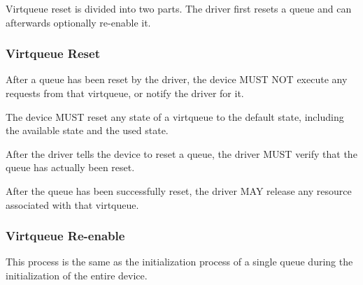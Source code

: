 Virtqueue reset is divided into two parts. The driver first resets a queue and
can afterwards optionally re-enable it.

\subsubsection{Virtqueue Reset}\label{sec:Basic Facilities of a Virtio Device / Virtqueues / Virtqueue Reset / Virtqueue Reset}


After a queue has been reset by the driver, the device MUST NOT execute
any requests from that virtqueue, or notify the driver for it.

The device MUST reset any state of a virtqueue to the default state,
including the available state and the used state.


After the driver tells the device to reset a queue, the driver MUST verify that
the queue has actually been reset.

After the queue has been successfully reset, the driver MAY release any
resource associated with that virtqueue.

\subsubsection{Virtqueue Re-enable}\label{sec:Basic Facilities of a Virtio Device / Virtqueues / Virtqueue Reset / Virtqueue Re-enable}

This process is the same as the initialization process of a single queue during
the initialization of the entire device.


